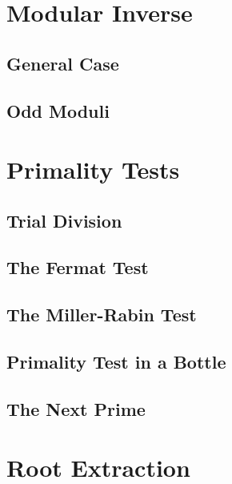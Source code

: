\documentclass[b5paper]{book}
\begin{document}
\section{Modular Inverse}
\subsection{General Case}
\subsection{Odd Moduli}
\section{Primality Tests}
\subsection{Trial Division}
\subsection{The Fermat Test}
\subsection{The Miller-Rabin Test}
\subsection{Primality Test in a Bottle}
\subsection{The Next Prime}
\section{Root Extraction}
\end{document}
